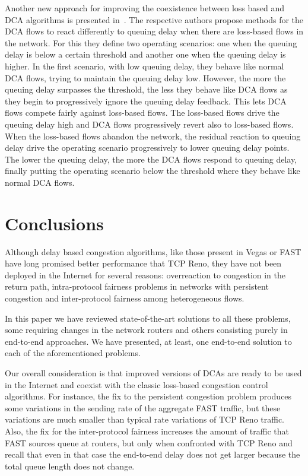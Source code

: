 \documentclass[english,times]{ettauth}
\begin{document}
Another new approach for improving the coexistence between loss based and DCA
algorithms is presented
in~\cite{budzisz09:_strat_fair_coexis_loss_delay,hayes10:_improv_coexis_loss_toler_delay}.
The respective authors propose methods for the DCA flows to react differently
to queuing delay when there are loss-based flows in the network. For this they
define two operating scenarios: one when the queuing delay is below a certain
threshold and another one when the queuing delay is higher. In the first
scenario, with low queuing delay, they behave like normal DCA flows, trying to
maintain the queuing delay low. However, the more the queuing delay surpasses
the threshold, the less they behave like DCA flows as they begin to
progressively ignore the queuing delay feedback. This lets DCA flows compete
fairly against loss-based flows. The loss-based flows drive the queuing delay
high and DCA flows progressively revert also to loss-based flows. When the
loss-based flows abandon the network, the residual reaction to queuing delay
drive the operating scenario progressively to lower queuing delay points. The
lower the queuing delay, the more the DCA flows respond to queuing delay,
finally putting the operating scenario below the threshold where they behave
like normal DCA flows.

\section{Conclusions}
\label{sec:conclusions}

Although delay based congestion algorithms, like those present in Vegas or
FAST have long promised better performance that TCP Reno, they have not been
deployed in the Internet for several reasons: overreaction to congestion in
the return path, intra-protocol fairness problems in networks with persistent
congestion and inter-protocol fairness among heterogeneous flows.

In this paper we have reviewed state-of-the-art solutions to all these
problems, some requiring changes in the network routers and others consisting
purely in end-to-end approaches. We have presented, at least, one end-to-end
solution to each of the aforementioned problems.

Our overall consideration is that improved versions of DCAs are ready to be
used in the Internet and coexist with the classic loss-based congestion
control algorithms. For instance, the fix to the persistent congestion problem
produces some variations in the sending rate of the aggregate FAST traffic,
but these variations are much smaller than typical rate variations of TCP Reno
traffic. Also, the fix for the inter-protocol fairness increases the amount of
traffic that FAST sources queue at routers, but only when confronted with TCP
Reno and recall that even in that case the end-to-end delay does not get
larger because the total queue length does not change.




\end{document}
